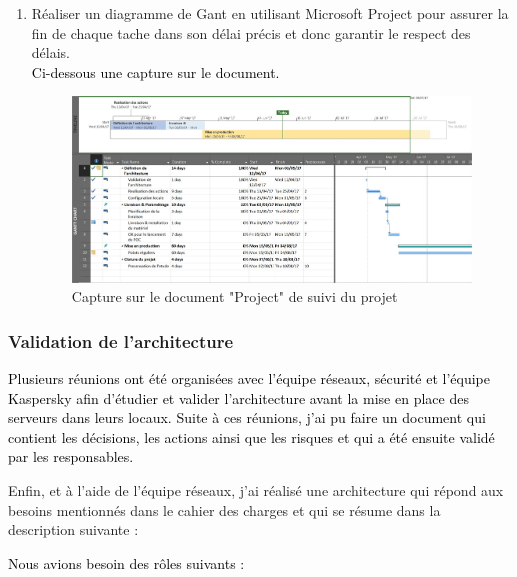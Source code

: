 \documentclass[a4paper,12pt]{report}
\begin{document}
\begin{enumerate}
\item Réaliser un diagramme de Gant en utilisant Microsoft Project pour assurer la fin de chaque tache dans son délai précis et donc garantir le respect des délais.
~~\\
\textcolor{black}{Ci-dessous une capture sur le document.}
\begin{figure}[H]
	\begin{center}
		\includegraphics[width=1\linewidth]{Projet_KATA/MSproject}
\end{center}
	\caption{Capture sur le document "Project" de suivi du projet }
	\label{fig:5}	
\end{figure}		 
		 
\end{enumerate}
\vspace{0.5cm}
\subsubsection{Validation de l’architecture}
\vspace{0.5cm}
\textcolor{black}{Plusieurs réunions ont été organisées avec l’équipe réseaux, sécurité et l’équipe Kaspersky afin d’étudier et valider l’architecture avant la mise en place des serveurs dans leurs locaux.}
\textcolor{black}{Suite à ces réunions, j’ai pu faire un document qui contient les décisions, les actions ainsi que les risques et qui a été ensuite validé par les responsables.}

\textcolor{blck}{ Enfin, et à l’aide de l’équipe réseaux, j’ai réalisé une architecture qui répond aux besoins mentionnés dans le cahier des charges et qui se résume dans la description suivante :}
\vspace{0.5cm}

\textcolor{black}{Nous avions besoin des rôles suivants :}
\end{document}
